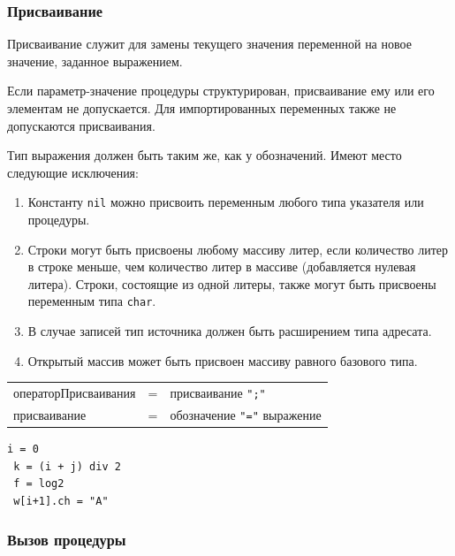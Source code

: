 \documentclass[a4paper,12pt]{article}
\newcommand{\lit}[1]{\texttt{"#1"}}
\begin{document}
    \subsubsection*{Присваивание}

    Присваивание служит для замены текущего значения переменной на новое значение, заданное выражением.

    Если параметр-значение процедуры структурирован, присваивание ему или его элементам не допускается. Для импортированных переменных также не допускаются присваивания.

    Тип выражения должен быть таким же, как у обозначений. Имеют место следующие исключения:

    \begin{enumerate}
        \item Константу \texttt{nil} можно присвоить переменным любого типа указателя или процедуры.
        \item Строки могут быть присвоены любому массиву литер, если количество литер в строке меньше, чем количество литер в массиве (добавляется нулевая литера). Строки, состоящие из одной литеры, также могут быть присвоены переменным типа \texttt{char}.
        \item В случае записей тип источника должен быть расширением типа адресата.
        \item Открытый массив может быть присвоен массиву равного базового типа.
    \end{enumerate}

    \begin{center}
        \begin{tabular}{l c l}
            операторПрисваивания & = & присваивание \lit{;} \\
            присваивание & = & обозначение \lit{=} выражение
        \end{tabular}
    \end{center}

    \begin{center}
        \begin{minipage}[t]{0.5\textwidth}
            \begin{lstlisting}[style=obouldstyle]
 i = 0
 k = (i + j) div 2
 f = log2
 w[i+1].ch = "A"
            \end{lstlisting}
        \end{minipage}
    \end{center}

    \subsubsection*{Вызов процедуры}
\end{document}
